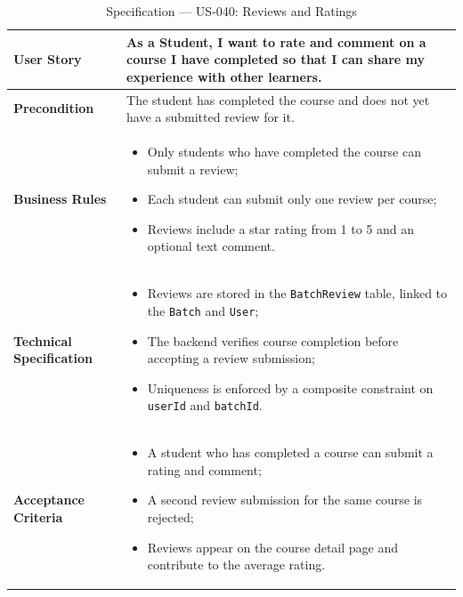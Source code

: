 \begin{table}[H]
\centering
\caption{Specification — US-040: Reviews and Ratings}
\label{tab:us040}
\renewcommand{\arraystretch}{1.2}
\begin{tabularx}{\textwidth}{|p{3.5cm}|X|}
\hline
\textbf{User Story} & As a Student, I want to rate and comment on a course I have completed so that I can share my experience with other learners. \\
\hline
\textbf{Precondition} & The student has completed the course and does not yet have a submitted review for it. \\
\hline
\textbf{Business Rules} &
\begin{itemize}[noitemsep, topsep=2pt]
  \item Only students who have completed the course can submit a review;
  \item Each student can submit only one review per course;
  \item Reviews include a star rating from 1 to 5 and an optional text comment.
\end{itemize} \\
\hline
\textbf{Technical Specification} &
\begin{itemize}[noitemsep, topsep=2pt]
  \item Reviews are stored in the \texttt{BatchReview} table, linked to the \texttt{Batch} and \texttt{User};
  \item The backend verifies course completion before accepting a review submission;
  \item Uniqueness is enforced by a composite constraint on \texttt{userId} and \texttt{batchId}.
\end{itemize} \\
\hline
\textbf{Acceptance Criteria} &
\begin{itemize}[noitemsep, topsep=2pt]
  \item A student who has completed a course can submit a rating and comment;
  \item A second review submission for the same course is rejected;
  \item Reviews appear on the course detail page and contribute to the average rating.
\end{itemize} \\
\hline
\end{tabularx}
\end{table}

